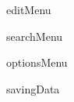 \documentclass[letterpaper]{article}
\begin{document}
\pagestyle{headings}

%
%


\setcounter{tocdepth}{3}










 {editMenu}


 {searchMenu}




 {optionsMenu}



 {savingData} 


\end{document}
